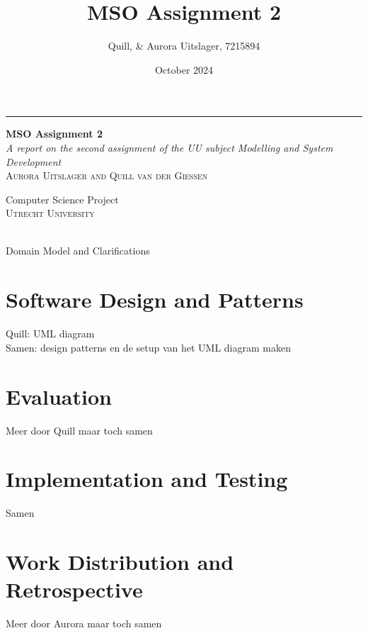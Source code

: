 \documentclass[a4paper, 11pt, oneside]{book} %
\title{MSO Assignment 2}
\author{Quill, \& Aurora Uitslager, 7215894}
\date{October 2024}
\begin{document}
\begin{titlepage} %
	
	\raggedleft %
	
	\rule{1pt}{\textheight} %
	\hspace{0.05\textwidth} %
	\parbox[b]{0.75\textwidth}{ %
		
		{\Huge \bfseries MSO Assignment 2}\\[2\baselineskip] %
		{\large\textit{A report on the second assignment of the UU subject Modelling and System Development}}\\[4\baselineskip] %
		{\Large\textsc{Aurora Uitslager and Quill van der Giessen}} %
		
		\vspace{0.5\textheight} %
		
		{\noindent \small Computer Science Project \\ \large \textsc{Utrecht University}~~\\}\\[\baselineskip] %
	}

\end{titlepage}

{Domain Model and Clarifications}

\section{Software Design and Patterns}
Quill: UML diagram\\
Samen: design patterns en de setup van het UML diagram maken

\section{Evaluation}
Meer door Quill maar toch samen

\section{Implementation and Testing}
Samen

\section{Work Distribution and Retrospective}
Meer door Aurora maar toch samen
\end{document}
